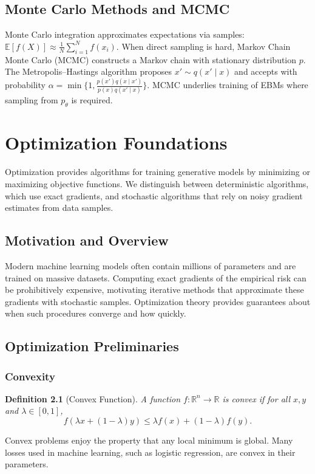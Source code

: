\documentclass[11pt]{book}
\newtheorem{definition}{Definition}[chapter]
\begin{document}
\section{Monte Carlo Methods and MCMC}
Monte Carlo integration approximates expectations via samples: $\mathbb{E}[f(X)]\approx\frac1N\sum_{i=1}^N f(x_i)$. When direct sampling is hard, Markov Chain Monte Carlo (MCMC) constructs a Markov chain with stationary distribution $p$. The Metropolis--Hastings algorithm proposes $x'\sim q(x'\mid x)$ and accepts with probability $\alpha=\min\{1, \frac{p(x')q(x\mid x')}{p(x)q(x'\mid x)}\}$. MCMC underlies training of EBMs where sampling from $p_\theta$ is required.

\chapter{Optimization Foundations}
Optimization provides algorithms for training generative models by minimizing or maximizing objective functions. We distinguish between deterministic algorithms, which use exact gradients, and stochastic algorithms that rely on noisy gradient estimates from data samples.

\section{Motivation and Overview}
Modern machine learning models often contain millions of parameters and are trained on massive datasets. Computing exact gradients of the empirical risk can be prohibitively expensive, motivating iterative methods that approximate these gradients with stochastic samples. Optimization theory provides guarantees about when such procedures converge and how quickly.

\section{Optimization Preliminaries}
\subsection{Convexity}
\begin{definition}[Convex Function]
A function $f: \mathbb{R}^n\to\mathbb{R}$ is \emph{convex} if for all $x,y$ and $\lambda\in[0,1]$,
\begin{equation}
f(\lambda x+(1-\lambda)y)\le \lambda f(x)+(1-\lambda)f(y).
\end{equation}
\end{definition}
Convex problems enjoy the property that any local minimum is global. Many losses used in machine learning, such as logistic regression, are convex in their parameters.
\end{document}
